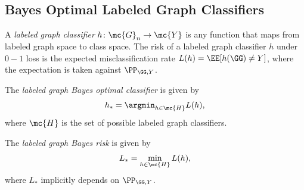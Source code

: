 \documentclass[10pt,journal,cspaper,compsoc]{IEEEtran}
\begin{document}
\subsection{Bayes Optimal Labeled Graph Classifiers} %
\label{sub:labeled_graph_classifiers}


	A \emph{labeled graph classifier} $h\colon \mc{G}_n \to \mc{Y}$ is any function that maps from labeled graph space to class space. The risk of a labeled graph classifier $h$ under $0-1$ loss is the expected misclassification rate $L(h)=\EE[h(\GG)\neq Y]$, where the expectation is taken against $\PP_{\GG,Y}$.
	
	The \emph{labeled graph Bayes optimal classifier} is given by
	\begin{align}
		h_* = \argmin_{h \in \mc{H}} L(h),
	\end{align}
	where $\mc{H}$ is the set of possible labeled graph classifiers.
	
	The \emph{labeled graph Bayes risk} is given by 
	\begin{align}
		L_* =\min_{h \in \mc{H}} L(h),
	\end{align}
	where $L_*$ implicitly depends on $\PP_{\GG,Y}$.



\end{document}
